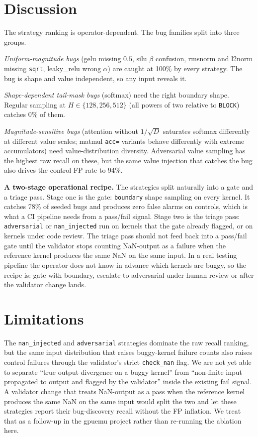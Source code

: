 \documentclass[runningheads]{llncs}
\begin{document}
\section{Discussion}
\label{sec:discussion}

The strategy ranking is operator-dependent. The bug families split
into three groups.

\textit{Uniform-magnitude bugs} (gelu missing $0.5$, silu $\beta$
confusion, rmsnorm and l2norm missing \texttt{sqrt}, leaky\_relu
wrong $\alpha$) are caught at 100\% by every strategy. The bug is
shape and value independent, so any input reveals it.

\textit{Shape-dependent tail-mask bugs} (softmax) need the right
boundary shape. Regular sampling at $H \in \{128, 256, 512\}$ (all
powers of two relative to \texttt{BLOCK}) catches 0\% of them.

\textit{Magnitude-sensitive bugs} (attention without $1/\sqrt{D}$
saturates softmax differently at different value scales; matmul
\texttt{acc=} variants behave differently with extreme accumulators)
need value-distribution diversity. Adversarial value sampling has the
highest raw recall on these, but the same value injection that
catches the bug also drives the control FP rate to 94\%.

\textbf{A two-stage operational recipe.} The strategies split
naturally into a gate and a triage pass. Stage one is the gate:
\texttt{boundary} shape sampling on every kernel. It catches 78\% of
seeded bugs and produces zero false alarms on controls, which is what
a CI pipeline needs from a pass/fail signal. Stage two is the triage
pass: \texttt{adversarial} or \texttt{nan\_injected} run on kernels
that the gate already flagged, or on kernels under code review. The
triage pass should not feed back into a pass/fail gate until the
validator stops counting NaN-output as a failure when the reference
kernel produces the same NaN on the same input. In a real testing
pipeline the operator does not know in advance which kernels are
buggy, so the recipe is: gate with boundary, escalate to adversarial
under human review or after the validator change lands.

\section{Limitations}
\label{sec:limitations}

The \texttt{nan\_injected} and \texttt{adversarial} strategies
dominate the raw recall ranking, but the same input distribution
that raises buggy-kernel failure counts also raises control failures
through the validator's strict \texttt{check\_nan} flag. We are not
yet able to separate ``true output divergence on a buggy kernel''
from ``non-finite input propagated to output and flagged by the
validator'' inside the existing fail signal. A validator change that
treats NaN-output as a pass when the reference kernel produces the
same NaN on the same input would split the two and let these
strategies report their bug-discovery recall without the FP
inflation. We treat that as a follow-up in the gpuemu project rather
than re-running the ablation here.
\end{document}
